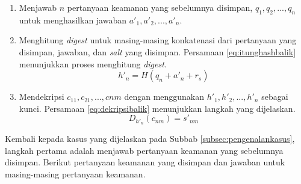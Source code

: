 \begin{enumerate}
	\item Menjawab \begin{math}n\end{math} pertanyaan keamanan yang sebelumnya disimpan, \begin{math}q_1, q_2, ..., q_n\end{math} untuk menghasilkan jawaban \begin{math}a'_1, a'_2, ..., a'_n\end{math}.
	\item Menghitung \textit{digest} untuk masing-masing konkatenasi dari pertanyaan yang disimpan, jawaban, dan \textit{salt} yang disimpan. Persamaan \ref{eq:itunghashbalik} menunjukkan proses menghitung \textit{digest}.
	\begin{equation}
		h'_n = H(q_n + a'_n + r_s) \label{eq:itunghashbalik}
	\end{equation}
	\item Mendekripsi \begin{math}c_{11}, c_{21}, ..., c{nm}\end{math} dengan menggunakan \begin{math}h'_1, h'_2, ..., h'_n\end{math} sebagai kunci. Persamaan \ref{eq:dekripsibalik} menunjukkan langkah yang dijelaskan.
	\begin{equation}
		D_{h'_n}(c_{nm}) = s'_{nm} \label{eq:dekripsibalik}
	\end{equation}
\end{enumerate}

Kembali kepada kasus yang dijelaskan pada Subbab \ref{subsec:pengenalankasus}, langkah pertama adalah menjawab pertanyaan keamanan yang sebelumnya disimpan. Berikut pertanyaan keamanan yang disimpan dan jawaban untuk masing-masing pertanyaan keamanan.


